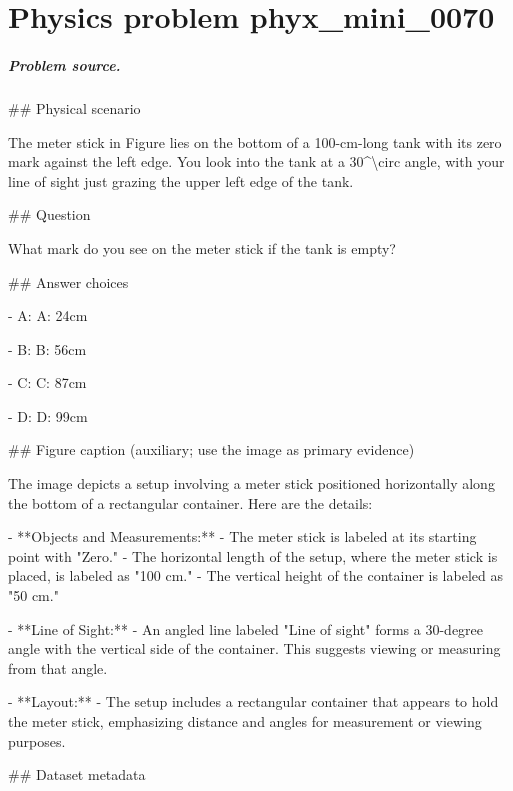 
\chapter{Physics problem phyx\_mini\_0070}
\label{ch:PhyXMiniProblems_problem_phyx_mini_0070}

\paragraph{Problem source.}
\#\# Physical scenario

The meter stick in Figure lies on the bottom of a 100-cm-long tank with its zero mark against the left edge. You look into the tank at a 30\textasciicircum{}\textbackslash{}circ angle, with your line of sight just grazing the upper left edge of the tank.

\#\# Question

What mark do you see on the meter stick if the tank is empty?

\#\# Answer choices

- A: A: 24cm

- B: B: 56cm

- C: C: 87cm

- D: D: 99cm

\#\# Figure caption (auxiliary; use the image as primary evidence)

The image depicts a setup involving a meter stick positioned horizontally along the bottom of a rectangular container. Here are the details:

- **Objects and Measurements:**
  - The meter stick is labeled at its starting point with "Zero."
  - The horizontal length of the setup, where the meter stick is placed, is labeled as "100 cm."
  - The vertical height of the container is labeled as "50 cm."

- **Line of Sight:**
  - An angled line labeled "Line of sight" forms a 30-degree angle with the vertical side of the container. This suggests viewing or measuring from that angle.

- **Layout:**
  - The setup includes a rectangular container that appears to hold the meter stick, emphasizing distance and angles for measurement or viewing purposes.

\#\# Dataset metadata

